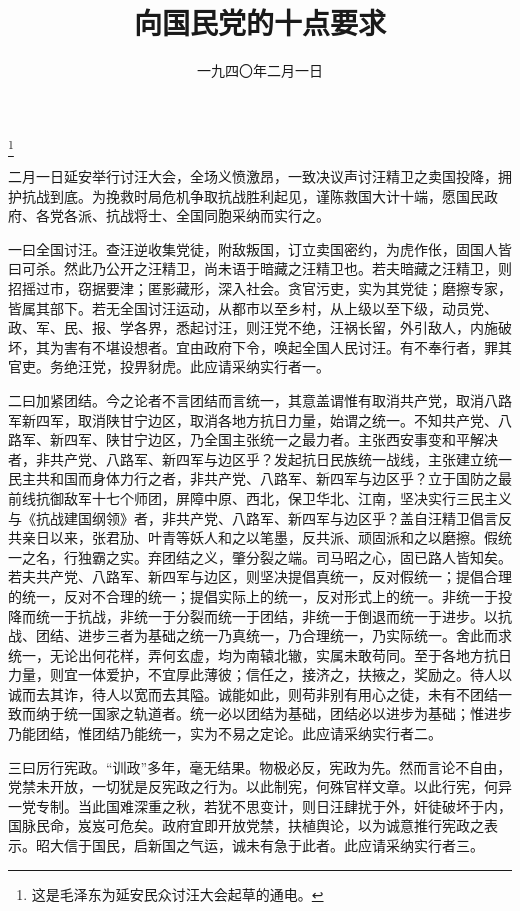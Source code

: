 
\title{向国民党的十点要求}
\date{一九四〇年二月一日}
\thanks{这是毛泽东为延安民众讨汪大会起草的通电。}
\maketitle


二月一日延安举行讨汪大会，全场义愤激昂，一致决议声讨汪精卫之卖国投降，拥护抗战到底。为挽救时局危机争取抗战胜利起见，谨陈救国大计十端，愿国民政府、各党各派、抗战将士、全国同胞采纳而实行之。

一曰全国讨汪。查汪逆收集党徒，附敌叛国，订立卖国密约，为虎作伥，固国人皆曰可杀。然此乃公开之汪精卫，尚未语于暗藏之汪精卫也。若夫暗藏之汪精卫，则招摇过市，窃据要津；匿影藏形，深入社会。贪官污吏，实为其党徒；磨擦专家，皆属其部下。若无全国讨汪运动，从都市以至乡村，从上级以至下级，动员党、政、军、民、报、学各界，悉起讨汪，则汪党不绝，汪祸长留，外引敌人，内施破坏，其为害有不堪设想者。宜由政府下令，唤起全国人民讨汪。有不奉行者，罪其官吏。务绝汪党，投畀豺虎。此应请采纳实行者一。

二曰加紧团结。今之论者不言团结而言统一，其意盖谓惟有取消共产党，取消八路军新四军，取消陕甘宁边区，取消各地方抗日力量，始谓之统一。不知共产党、八路军、新四军、陕甘宁边区，乃全国主张统一之最力者。主张西安事变和平解决者，非共产党、八路军、新四军与边区乎？发起抗日民族统一战线，主张建立统一民主共和国而身体力行之者，非共产党、八路军、新四军与边区乎？立于国防之最前线抗御敌军十七个师团，屏障中原、西北，保卫华北、江南，坚决实行三民主义与《抗战建国纲领》者，非共产党、八路军、新四军与边区乎？盖自汪精卫倡言反共亲日以来，张君劢、叶青等妖人和之以笔墨，反共派、顽固派和之以磨擦。假统一之名，行独霸之实。弃团结之义，肇分裂之端。司马昭之心，固已路人皆知矣。若夫共产党、八路军、新四军与边区，则坚决提倡真统一，反对假统一；提倡合理的统一，反对不合理的统一；提倡实际上的统一，反对形式上的统一。非统一于投降而统一于抗战，非统一于分裂而统一于团结，非统一于倒退而统一于进步。以抗战、团结、进步三者为基础之统一乃真统一，乃合理统一，乃实际统一。舍此而求统一，无论出何花样，弄何玄虚，均为南辕北辙，实属未敢苟同。至于各地方抗日力量，则宜一体爱护，不宜厚此薄彼；信任之，接济之，扶掖之，奖励之。待人以诚而去其诈，待人以宽而去其隘。诚能如此，则苟非别有用心之徒，未有不团结一致而纳于统一国家之轨道者。统一必以团结为基础，团结必以进步为基础；惟进步乃能团结，惟团结乃能统一，实为不易之定论。此应请采纳实行者二。

三曰厉行宪政。“训政”多年，毫无结果。物极必反，宪政为先。然而言论不自由，党禁未开放，一切犹是反宪政之行为。以此制宪，何殊官样文章。以此行宪，何异一党专制。当此国难深重之秋，若犹不思变计，则日汪肆扰于外，奸徒破坏于内，国脉民命，岌岌可危矣。政府宜即开放党禁，扶植舆论，以为诚意推行宪政之表示。昭大信于国民，启新国之气运，诚未有急于此者。此应请采纳实行者三。

